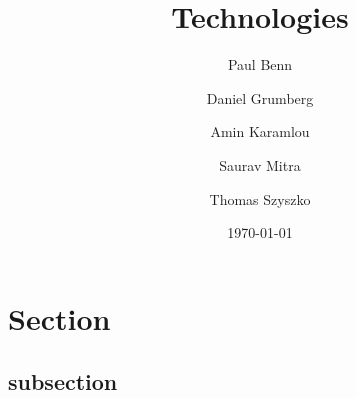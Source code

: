 \documentclass[a4wide, 11pt]{article}
\begin{document}
\title{Technologies}

\author{Paul Benn \and Daniel Grumberg \and Amin Karamlou \and Saurav Mitra \and Thomas Szyszko }

\date{\today}

\maketitle

\clearpage

\section{Section}

\subsection{subsection} 
\end{document}

